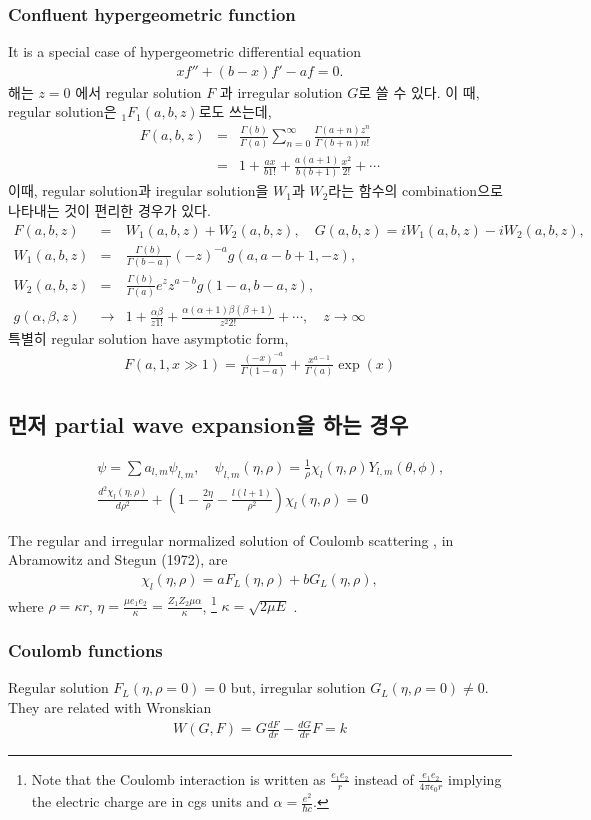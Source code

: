 \documentclass[10pt]{article}
\newcommand{\bea}{\begin{eqnarray}}
\newcommand{\eea}{\end{eqnarray}}
\newcommand{\no}{\nonumber \\}
\begin{document}
\subsubsection{Confluent hypergeometric function}
It is a special case of hypergeometric differential equation
\bea
x f''+(b-x)f'-af=0. 
\eea
해는 $z=0$ 에서 regular solution $F$
과 irregular solution $G$로 쓸 수 있다. 
이 때, regular solution은 $_1F_1(a,b,z)$로도 쓰는데,
\bea
F(a,b,z)&=&\frac{\Gamma(b)}{\Gamma(a)}\sum_{n=0}^\infty 
   \frac{\Gamma(a+n)z^n}{\Gamma(b+n)n!}\no 
      &=&1+\frac{ax}{b1!}+\frac{a(a+1)}{b(b+1)}\frac{x^2}{2!}+\cdots
\eea
이때, regular solution과 iregular solution을 $W_1$과 $W_2$라는
함수의 combination으로 나타내는 것이 편리한 경우가 있다.
\bea
F(a,b,z)&=&W_1(a,b,z)+W_2(a,b,z),
\quad G(a,b,z)=i W_1(a,b,z)-iW_2(a,b,z),\no
W_1(a,b,z)&=&\frac{\Gamma(b)}{\Gamma(b-a)} (-z)^{-a} g(a,a-b+1,-z),\no
W_2(a,b,z)&=&\frac{\Gamma(b)}{\Gamma(a)}e^z z^{a-b}  g(1-a,b-a,z),\no
g(\alpha,\beta,z)&\to& 1+\frac{\alpha\beta}{z 1!}
 +\frac{\alpha(\alpha+1)\beta(\beta+1)}{z^2 2!}+\cdots,
 \quad {z\to \infty}
\eea
특별히 regular solution have asymptotic form,
\bea
F(a,1,x\gg 1)=\frac{(-x)^{-a}}{\Gamma(1-a)}
             +\frac{x^{a-1}}{\Gamma(a)}\exp(x)
\eea

\subsection{먼저  partial wave expansion을 하는 경우}
\bea
& &\psi=\sum a_{l,m} \psi_{l,m},\quad
   \psi_{l,m}(\eta,\rho)=\frac{1}{\rho} \chi_{l}(\eta,\rho) Y_{l,m}(\theta,\phi),\no
& &\frac{d^2 \chi_l(\eta,\rho)}{d\rho^2}
   +(1-\frac{2\eta}{\rho}-\frac{l(l+1)}{\rho^2})\chi_l(\eta,\rho)=0
\eea

The regular and irregular normalized solution of Coulomb scattering
, in Abramowitz and Stegun (1972), are 
\bea
\chi_l(\eta,\rho)=a F_L(\eta,\rho)+b G_L(\eta,\rho),
\eea
where
$\rho=\kappa r$, 
$\eta=\frac{\mu e_1 e_2}{\kappa}=\frac{Z_1 Z_2 \mu\alpha}{\kappa}$,
\footnote{
Note that the Coulomb interaction is written as
$\frac{e_1 e_2}{r}$ instead of 
$\frac{e_1 e_2}{4\pi\epsilon_0 r}$
implying the electric charge are in cgs units and
$\alpha=\frac{e^2}{\hbar c}$. }
$\kappa=\sqrt{2\mu E}$
. 
\subsubsection{Coulomb functions}
Regular solution $F_L(\eta,\rho=0)=0$ but,
irregular solution $G_L(\eta,\rho=0)\neq 0$.
They are related with Wronskian
\bea
W(G,F)=G \frac{dF}{dr}-\frac{dG}{dr} F=k
\eea
\end{document}
